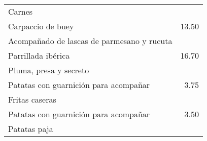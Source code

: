 \documentclass[12pt]{article}
\makeatletter
\newcommand*\ColText[1]{\textcolor{Goldenrod3}{#1}}
\newenvironment{Group}[1]
  {\noindent\begin{tabular*}{\textwidth}{@{}p{.8\linewidth}@{\extracolsep{\fill}}r@{}}
    {\fontsize{24}{29}\selectfont\ColText{#1}}\\[0.8em]}
  {\end{tabular*}}
\newcommand*\Entry[2]{%
  \sffamily#1 & #2}
\newcommand*\Expl[1]{%
  \hspace*{1em}\footnotesize #1}
\makeatother
\begin{document}
\vfill

\begin{Group}{Carnes}
\Entry{Carpaccio de buey}{13.50} \\
\Expl{Acompañado de lascas de parmesano y rucuta} \\
\Entry{Parrillada ibérica}{16.70} \\
\Expl{Pluma, presa y secreto} \\
\Entry{Patatas con guarnición para acompañar}{3.75} \\
\Expl{Fritas caseras} \\
\Entry{Patatas con guarnición para acompañar}{3.50} \\
\Expl{Patatas paja} \\
\end{Group}
\end{document}
